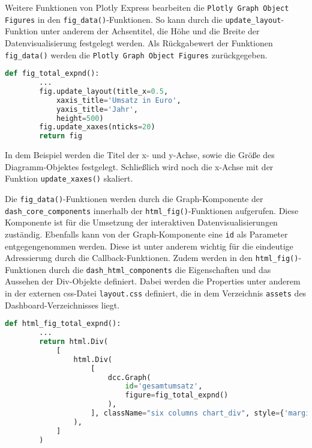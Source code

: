     Weitere Funktionen von Plotly Express bearbeiten die \texttt{Plotly Graph Object Figures} in den \texttt{fig\_data()}-Funktionen. 
    So kann durch die \texttt{update\_layout}-Funktion unter anderem der Achsentitel, die Höhe und die Breite der Datenvisualisierung 
    festgelegt werden. Als Rückgabewert der Funktionen \texttt{fig\_data()} werden die \texttt{Plotly Graph Object Figures} zurückgegeben.

    \begin{lstlisting}[language=Python, caption=fig\_total\_expnd() Auszug 2]  
    def fig_total_expnd():
        ...
        fig.update_layout(title_x=0.5,
            xaxis_title='Umsatz in Euro',
            yaxis_title='Jahr',
            height=500)
        fig.update_xaxes(nticks=20)         
        return fig
    \end{lstlisting}

    In dem Beispiel werden die Titel der x- und y-Achse, sowie die
    Größe des Diagramm-Objektes festgelegt. Schließlich wird noch die x-Achse mit der Funktion \texttt{update\_xaxes()} skaliert.
    
    Die \texttt{fig\_data()}-Funktionen werden durch die Graph-Komponente der \texttt{dash\_core\_components} innerhalb der 
    \texttt{html\_fig()}-Funktionen aufgerufen. Diese Komponente ist für die Umsetzung der interaktiven Datenvisualisierungen 
    zuständig. Ebenfalls kann von der Graph-Komponente eine \texttt{id} als Parameter entgegengenommen werden. 
    Diese ist unter anderem wichtig für die eindeutige Adressierung durch die Callback-Funktionen.
    Zudem werden in den \texttt{html\_fig()}-Funktionen durch die \texttt{dash\_html\_components} die Eigenschaften und 
    das Aussehen der Div-Objekte definiert. 
    Dabei werden die Properties unter anderem in der externen css-Datei \texttt{layout.css} definiert, die in dem Verzeichnis \texttt{assets} 
    des Dashboard-Verzeichnisses liegt.

    \begin{lstlisting}[language=Python, caption={html\_fig\_total\_expnd()}] 
        def html_fig_total_expnd():
        ...
        return html.Div(
            [
                html.Div(
                    [
                        dcc.Graph(
                            id='gesamtumsatz',
                            figure=fig_total_expnd()
                        ),
                    ], className="six columns chart_div", style={'margin-top': '20px', 'margin-left': '10px'}
                ),
            ]
        )
        \end{lstlisting}
    
